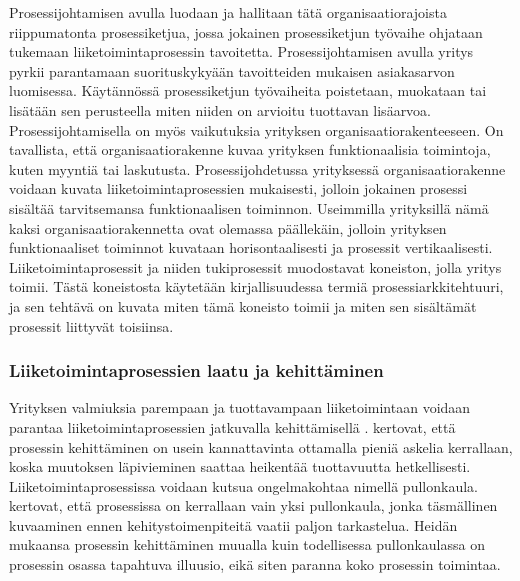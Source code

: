 \documentclass[finnish,12pt,a4paper,pdftex]{article}
\begin{document}
Prosessijohtamisen avulla luodaan ja hallitaan tätä organisaatiorajoista riippumatonta prosessiketjua, jossa jokainen prosessiketjun työvaihe ohjataan tukemaan liiketoimintaprosessin tavoitetta. Prosessijohtamisen avulla yritys pyrkii parantamaan suorituskykyään tavoitteiden mukaisen asiakasarvon luomisessa. Käytännössä prosessiketjun työvaiheita poistetaan, muokataan tai lisätään sen perusteella miten niiden on arvioitu tuottavan lisäarvoa. \citep{ohjelmistotuotanto}\\

Prosessijohtamisella on myös vaikutuksia yrityksen organisaatiorakenteeseen. On tavallista, että organisaatiorakenne kuvaa yrityksen funktionaalisia toimintoja, kuten myyntiä tai laskutusta. Prosessijohdetussa yrityksessä organisaatiorakenne voidaan kuvata liiketoimintaprosessien mukaisesti, jolloin jokainen prosessi sisältää tarvitsemansa funktionaalisen toiminnon. Useimmilla yrityksillä nämä kaksi organisaatiorakennetta ovat olemassa päällekäin, jolloin yrityksen funktionaaliset toiminnot kuvataan horisontaalisesti ja prosessit vertikaalisesti. \citep{vanhatorre}\\

Liiketoimintaprosessit ja niiden tukiprosessit muodostavat koneiston, jolla yritys toimii. Tästä koneistosta käytetään kirjallisuudessa termiä prosessiarkkitehtuuri, ja sen tehtävä on kuvata miten tämä koneisto toimii ja miten sen sisältämät prosessit liittyvät toisiinsa. 

\subsubsection{Liiketoimintaprosessien laatu ja kehittäminen}

Yrityksen valmiuksia parempaan ja tuottavampaan liiketoimintaan voidaan parantaa liiketoimintaprosessien jatkuvalla kehittämisellä \citep{teollisuustalous, leanit, ohjelmistotuotanto}. \citeauthor{ohjelmistotuotanto} kertovat, että prosessin kehittäminen on usein kannattavinta ottamalla pieniä askelia kerrallaan, koska muutoksen läpivieminen saattaa heikentää tuottavuutta hetkellisesti. Liiketoimintaprosessissa voidaan kutsua ongelmakohtaa nimellä pullonkaula.  \cite{devops} kertovat, että prosessissa on kerrallaan vain yksi pullonkaula, jonka täsmällinen kuvaaminen ennen kehitystoimenpiteitä vaatii paljon tarkastelua. Heidän mukaansa prosessin kehittäminen muualla kuin todellisessa pullonkaulassa on prosessin osassa tapahtuva illuusio, eikä siten paranna koko prosessin toimintaa.
\end{document}
